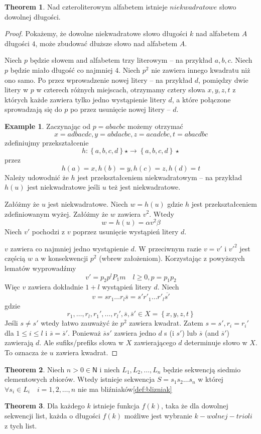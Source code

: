 \documentclass[11pt,a4paper]{article}
\theoremstyle{definition}
\newtheorem{theorem}{Theorem}[section]
\newtheorem{example}{Example}[section]
\begin{document}
\begin{theorem}
Nad czteroliterowym alfabetem istnieje $niekwadratowe$
słowo dowolnej długości.
\begin{proof}
Pokażemy, że dowolne niekwadratowe słowo długości $k$ nad alfabetem $A$
długości $4$, może zbudować dłuższe słowo nad alfabetem $A$.

Niech $p$ będzie słowem and alfabetem trzy literowym -- na przykład $a,b,c$.
Niech $p$ będzie miało długość co najmniej $4$.
Niech $p^2$ nie zawiera innego kwadratu niż ono samo.
Po przez wprowadzenie nowej litery -- na przykład $d$, pomiędzy
dwie litery w $p$ w czterech różnych miejscach, otrzymamy cztery
słowa $x,y,z,t$ z których każde zawiera tylko jedno wystąpienie litery $d$,
a które połączone sprowadzają się do $p$ po przez usunięcie nowej litery -- $d$.

\begin{example}
Zaczynając od $p = abacbc$ możemy otrzymać
$$
x = adbacdc, y = abdacbc, z = acadcbc, t = abacdbc
$$
zdefiniujmy przekształcenie 
$$
h: \left\lbrace a,b,c,d\right\rbrace\star \rightarrow \left\lbrace a,b,c,d\right\rbrace\star 
$$
przez
$$
h(a) = x, h(b) = y, h(c) = z, h(d) = t
$$
Należy udowodnić że $h$ jest przekształceniem niekwadratowym -- na przykład
$h(u)$ jest niekwadratowe jeśli $u$ też jest niekwadratowe.
\end{example}
Załóżmy że $u$ jest niekwadratowe. Niech $w=h(u)$ gdzie $h$ jest przekształceniem
zdefiniowanym wyżej. Załóżmy że $w$ zawiera $v^2$. Wtedy
$$
w = h(u) = \alpha v^2\beta
$$
Niech $v'$ pochodzi z $v$ poprzez usunięcie wystąpień litery $d$.

$v$ zawiera co najmniej jedno wystąpienie $d$. W przeciwnym razie $v = v'$ i
$v'^2$ jest częścią $w$ a w konsekwencji $p^2$ (wbrew założeniom). Korzystając z 
powyższych lematów wyprowadźmy
$$
v' = p_2 p^l P_1 m \quad l \geq 0, p = p_1 p_2
$$
Więc $v$ zawiera dokładnie $1+l$ wystąpień litery $d$. Niech
$$
v = sr_1\dots r_l\overline{s} = s'r'_1\dots r'_l\overline{s'}
$$
gdzie 
$$
r_1,\ldots,r_l,r_1',\ldots,r_l',\overline{s},\overline{s}' 
\in X = \left\lbrace x,y,z,t \right\rbrace
$$
Jeśli $s \neq s'$ wtedy łatwo zauważyć że $p^2$ zawiera kwadrat.
Zatem $s=s', r_i=r_i'$ dla 
$1 \leq i \leq l$ 
i 
$\overline{s} = \overline{s}'$. Ponieważ $\overline{s}s'$ zawiera
jedno $d$ s (i $s'$) lub $\overline{s}$ (and $\overline{s}'$) 
zawierają $d$. Ale sufiks/prefiks słowa w $X$ zawierającego $d$
determinuje słowo w $X$. To oznacza że $u$ zawiera kwadrat.
\end{proof}
\end{theorem}

\begin{theorem}
Niech $n > 0 \in \mathsf{N}$ i 
niech $L_1,L_2,\ldots,L_n$ będzie sekwencją 
siedmio elementowych zbiorów. Wtedy istnieje sekwencja $S=s_1s_2\ldots s_n$ w której
$\forall s_i \in L_i \quad i = 1,2,\ldots,n$ nie ma bliźniaków\ref{def:blizniak}
\end{theorem}

\begin{theorem}
Dla każdego $k$ istnieje funkcja $f(k)$, taka że
dla dowolnej sekwencji list, każda o długości $f(k)$
możliwe jest wybranie $k-wolnej-trioli$ z tych list.

\end{theorem}
\end{document}
